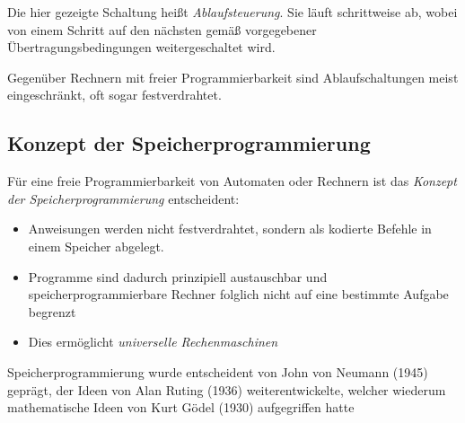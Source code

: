 \documentclass[12pt]{report}
\begin{document}
\begin{defbox}[Ablaufsteuerung]
  Die hier gezeigte Schaltung heißt \textit{Ablaufsteuerung}. Sie läuft schrittweise ab,
  wobei von einem Schritt auf den nächsten gemäß vorgegebener Übertragungsbedingungen weitergeschaltet wird.
  
  Gegenüber Rechnern mit freier Programmierbarkeit sind Ablaufschaltungen meist eingeschränkt, oft sogar festverdrahtet.
\end{defbox}

\subsection{Konzept der Speicherprogrammierung}
\begin{defbox}
  Für eine freie Programmierbarkeit von Automaten oder Rechnern ist das \textit{Konzept der Speicherprogrammierung} entscheident:
  \begin{itemize}
    \item Anweisungen werden nicht festverdrahtet, sondern als kodierte Befehle in einem Speicher abgelegt.
    \item Programme sind dadurch prinzipiell austauschbar und speicherprogrammierbare Rechner folglich nicht auf eine bestimmte Aufgabe begrenzt
    \item Dies ermöglicht \textit{universelle Rechenmaschinen}
  \end{itemize}
\end{defbox}

\begin{infobox}
  Speicherprogrammierung wurde entscheident von John von Neumann (1945) geprägt, der Ideen von Alan Ruting (1936) weiterentwickelte, welcher wiederum mathematische Ideen von Kurt Gödel (1930) aufgegriffen hatte
\end{infobox}
\end{document}
